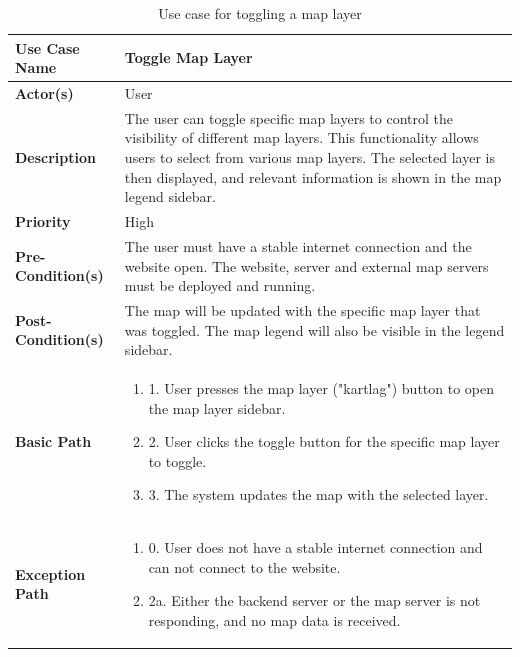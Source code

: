\begin{table}[h]
    \centering
    \begin{tabularx}{\textwidth}{|l|X|}
        \hline
        \rowcolor{gray!20}
        \textbf{Use Case Name} & Toggle Map Layer \\
        \hline
        \textbf{Actor(s)} & User \\
        \hline
        \textbf{Description} & The user can toggle specific map layers to control the visibility of different map layers. This functionality allows users to select from various map layers. The selected layer is then displayed, and relevant information is shown in the map legend sidebar. \\
        \hline
        \textbf{Priority} & High \\
        \hline
        \textbf{Pre-Condition(s)} & The user must have a stable internet connection and the website open. The website, server and external map servers must be deployed and running.\\
        \hline
        \textbf{Post-Condition(s)} & The map will be updated with the specific map layer that was toggled. The map legend will also be visible in the legend sidebar. \\
        \hline
        \textbf{Basic Path} &  
        \begin{enumerate}[label=,left=0pt]
            \item 1. User presses the map layer ("kartlag") button to open the map layer sidebar.
            \item 2. User clicks the toggle button for the specific map layer to toggle.
            \item 3. The system updates the map with the selected layer.
        \end{enumerate} \\
        \hline
        \textbf{Exception Path} & 
        \begin{enumerate}[label=,left=0pt]
            \item 0. User does not have a stable internet connection and can not connect to the website.
            \item 2a. Either the backend server or the map server is not responding, and no map data is received.
        \end{enumerate} \\
        \hline
    \end{tabularx}
    \caption[Use Case Specification: Toggle Map Layer]{Use case for toggling a map layer}
    \label{tab:use_case_toggle_layer}
\end{table}